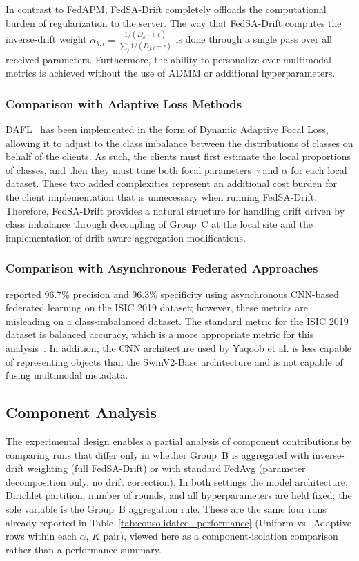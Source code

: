 \documentclass[utf8]{FrontiersinHarvard} %
\newcommand{\sadrift}{FedSA-Drift}
\begin{document}
In contrast to FedAPM, \sadrift{} completely offloads the computational burden of regularization to the server. The way that \sadrift{} computes the inverse-drift weight $\hat{\alpha}_{k,l} = \frac{1/(D_{k,l} + \epsilon)}{\sum_j 1/(D_{j,l} + \epsilon)}$ is done through a single pass over all received parameters. Furthermore, the ability to personalize over multimodal metrics is achieved without the use of ADMM or additional hyperparameters.

\subsubsection{Comparison with Adaptive Loss Methods}

DAFL~\citep{Zhao2025} has been implemented in the form of Dynamic Adaptive Focal Loss, allowing it to adjust to the class imbalance between the distributions of classes on behalf of the clients. As such, the clients must first estimate the local proportions of classes, and then they must tune both focal parameters $\gamma$ and $\alpha$ for each local dataset. These two added complexities represent an additional cost burden for the client implementation that is unnecessary when running \sadrift{}. Therefore, \sadrift{} provides a natural structure for handling drift driven by class imbalance through decoupling of Group~C at the local site and the implementation of drift-aware aggregation modifications.

\subsubsection{Comparison with Asynchronous Federated Approaches}

\citet{Yaqoob2023} reported 96.7\% precision and 96.3\% specificity using asynchronous CNN-based federated learning on the ISIC 2019 dataset; however, these metrics are misleading on a class-imbalanced dataset. The standard metric for the ISIC 2019 dataset is balanced accuracy, which is a more appropriate metric for this analysis~\citep{Gessert2020}. In addition, the CNN architecture used by Yaqoob et al. is less capable of representing objects than the SwinV2-Base architecture and is not capable of fusing multimodal metadata.

\subsection{Component Analysis}
\label{sec:component_analysis}

The experimental design enables a partial analysis of component contributions by comparing runs that differ only in whether Group~B is aggregated with inverse-drift weighting (full \sadrift{}) or with standard FedAvg (parameter decomposition only, no drift correction). In both settings the model architecture, Dirichlet partition, number of rounds, and all hyperparameters are held fixed; the sole variable is the Group~B aggregation rule. These are the same four runs already reported in Table~\ref{tab:consolidated_performance} (Uniform vs.\ Adaptive rows within each $\alpha$, $K$ pair), viewed here as a component-isolation comparison rather than a performance summary.
\end{document}
